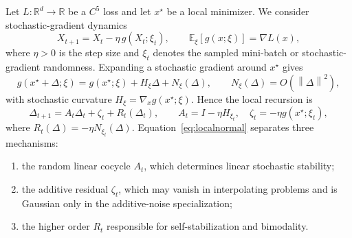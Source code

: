 \documentclass{article} %
\theoremstyle{plain}
\theoremstyle{definition}
\newcommand{\E}{\mathbb{E}}
\newcommand{\norm}[1]{\left\lVert #1\right\rVert}
\begin{document}
Let \(L:\mathbb R^d\to \mathbb R\) be a \(C^5\) loss and let $x^\star$ be a local minimizer.  We consider stochastic-gradient dynamics
\begin{equation}
    X_{t+1}=X_t-\eta\,g(X_t;\xi_t),
    \qquad \E_{\xi}[g(x;\xi)]=\nabla L(x),
    \label{eq:sgd}
\end{equation}
where $\eta>0$ is the step size and $\xi_t$ denotes the sampled mini-batch or stochastic-gradient randomness. Expanding a stochastic gradient around $x^\star$ gives
\begin{equation}
 g(x^\star+\Delta;\xi)
 =g(x^\star;\xi)+H_{\xi}\Delta+N_{\xi}(\Delta),
 \qquad N_{\xi}(\Delta)=O(\norm{\Delta}^2),
 \label{eq:localgrad}
\end{equation}
with stochastic curvature $H_{\xi}=\nabla_xg(x^\star;\xi)$.  Hence the local recursion is
\begin{equation}
 \Delta_{t+1}
 =A_t\Delta_t+\zeta_t+R_t(\Delta_t),
 \qquad
 A_t=I-\eta H_{\xi_t},
 \quad
 \zeta_t=-\eta g(x^\star;\xi_t),
 \label{eq:localnormal}
\end{equation}
where $R_t(\Delta)=-\eta N_{\xi_t}(\Delta)$.  Equation~\eqref{eq:localnormal} separates three mechanisms:
\begin{enumerate}[leftmargin=1.6em,itemsep=0.15em]
    \item the random linear cocycle $A_t$, which determines linear stochastic stability;
    \item the additive residual $\zeta_t$, which may vanish in interpolating problems and is Gaussian only in the additive-noise specialization;
    \item the higher order $R_t$ responsible for self-stabilization and bimodality.
\end{enumerate}
\end{document}
